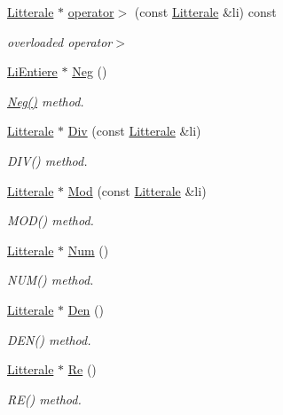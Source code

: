 \begin{DoxyCompactItemize}
\hyperlink{class_litterale}{Litterale} $\ast$ \hyperlink{class_li_entiere_a92f1f5e097a794670463127a638a2f7b}{operator$>$} (const \hyperlink{class_litterale}{Litterale} \&li) const 
\begin{DoxyCompactList}\small\item\em overloaded operator$>$ \end{DoxyCompactList}\item 
\hyperlink{class_li_entiere}{Li\+Entiere} $\ast$ \hyperlink{class_li_entiere_a708a535d92593c881c749f70bbdfacde}{Neg} ()
\begin{DoxyCompactList}\small\item\em \hyperlink{class_li_entiere_a708a535d92593c881c749f70bbdfacde}{Neg()} method. \end{DoxyCompactList}\item 
\hyperlink{class_litterale}{Litterale} $\ast$ \hyperlink{class_li_entiere_ac8dff5087eff515905a3d20764ed4095}{Div} (const \hyperlink{class_litterale}{Litterale} \&li)
\begin{DoxyCompactList}\small\item\em D\+I\+V() method. \end{DoxyCompactList}\item 
\hyperlink{class_litterale}{Litterale} $\ast$ \hyperlink{class_li_entiere_a9e0d8652c27234c9671ea6146477fa92}{Mod} (const \hyperlink{class_litterale}{Litterale} \&li)
\begin{DoxyCompactList}\small\item\em M\+O\+D() method. \end{DoxyCompactList}\item 
\hyperlink{class_litterale}{Litterale} $\ast$ \hyperlink{class_li_entiere_a482e5cb35a25e22bd243490e7444bf96}{Num} ()
\begin{DoxyCompactList}\small\item\em N\+U\+M() method. \end{DoxyCompactList}\item 
\hyperlink{class_litterale}{Litterale} $\ast$ \hyperlink{class_li_entiere_ac8936753e6ecfe460e14966b81f0b7e6}{Den} ()
\begin{DoxyCompactList}\small\item\em D\+E\+N() method. \end{DoxyCompactList}\item 
\hyperlink{class_litterale}{Litterale} $\ast$ \hyperlink{class_li_entiere_a6751154aae61b70ef2330a1e9155ed1a}{Re} ()
\begin{DoxyCompactList}\small\item\em R\+E() method. \end{DoxyCompactList}\item 

\end{DoxyCompactItemize}
